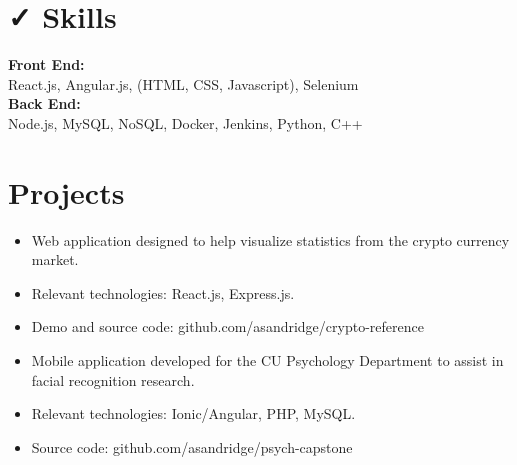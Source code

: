 \documentclass{resume}
\begin{document}
\section{{\faCheck} Skills}
\textbf{Front End:} \\
React.js, Angular.js, (HTML, CSS, Javascript), Selenium\\

\bigskip
\textbf{Back End:} \\
Node.js, MySQL, NoSQL, Docker, Jenkins, Python, C++\\

\section{{\faFolder} Projects}
\begin{itemize}
  \item Web application designed to help visualize statistics from the crypto currency market.
  \item Relevant technologies: React.js, Express.js.
  \item Demo and source code: github.com/asandridge/crypto-reference
\end{itemize}
\bigskip
{}
\begin{itemize}
  \item Mobile application developed for the CU Psychology Department to assist in facial recognition research.
  \item Relevant technologies: Ionic/Angular, PHP, MySQL.
  \item Source code: github.com/asandridge/psych-capstone
\end{itemize}
\end{document}
